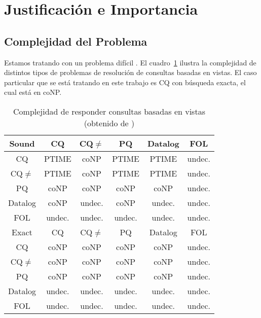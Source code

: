 \section{Justificación e Importancia}

\subsection{Complejidad del Problema}

Estamos tratando con un problema difícil \cite{lenzerini:dataintegration}. 
El cuadro~\ref{cqcomplexity} ilustra la complejidad de distintos tipos de
problemas de resolución de consultas basadas en vistas. El caso particular que
se está tratando en este trabajo es CQ con búsqueda exacta, el cual está en
coNP.

\begin{table}
\begin{center}
  \begin{tabular}{|c||c|c|c|c|c|}
\hline
Sound  &  CQ  & CQ$\neq$  & PQ  &Datalog &FOL \\
\hline
  CQ  & PTIME &coNP  &PTIME &PTIME  &undec. \\
 CQ$\neq$  & PTIME &coNP  &PTIME &PTIME  &undec. \\
  PQ  &  coNP &coNP  & coNP & coNP  &undec. \\
Datalog &coNP &undec.& coNP &undec. &undec. \\
 FOL  & undec.&undec.&undec.&undec. &undec. \\
\hline
 Exact  & CQ &  CQ$\neq$     &  PQ  &Datalog &FOL \\
\hline
  CQ    &coNP &coNP  & coNP & coNP  &undec. \\
 CQ$\neq$    &coNP &coNP  & coNP & coNP  &undec. \\
  PQ    &coNP &coNP  & coNP & coNP  &undec. \\
Datalog&undec.&undec.&undec.&undec. &undec. \\
 FOL   &undec.&undec.&undec.&undec. &undec. \\
\hline
  \end{tabular}
  \caption{Complejidad de responder consultas basadas en vistas (obtenido de
\cite{lenzerini:dataintegration})}
  \label{cqcomplexity}
\end{center}
\end{table}
